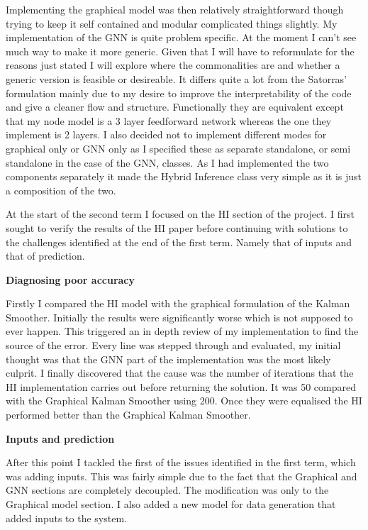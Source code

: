 \documentclass[]{../resources/final_report}
\begin{document}
Implementing the graphical model was then relatively straightforward though trying to keep it self contained and modular complicated things slightly. My implementation of the GNN is quite problem specific. At the moment I can't see much way to make it more generic. Given that I will have to reformulate for the reasons just stated I will explore where the commonalities are and whether a generic version is feasible or desireable. It differs quite a lot from the Satorras' formulation mainly due to my desire to improve the interpretability of the code and give a cleaner flow and structure. Functionally they are equivalent except that my node model is a 3 layer feedforward network whereas the one they implement is 2 layers. I also decided not to implement different modes for graphical only or GNN only as I specified these as separate standalone, or semi standalone in the case of the GNN, classes. As I had implemented the two components separately it made the Hybrid Inference class very simple as it is just a composition of the two.

\pagebreak

At the start of the second term I focused on the HI section of the project. I first sought to verify the results of the HI paper before continuing with solutions to the challenges identified at the end of the first term. Namely that of inputs and that of prediction.

\textbf{Diagnosing poor accuracy}

Firstly I compared the HI model with the graphical formulation of the Kalman Smoother. Initially the results were significantly worse which is not supposed to ever happen. This triggered an in depth review of my implementation to find the source of the error. Every line was stepped through and evaluated, my initial thought was that the GNN part of the implementation was the most likely culprit. I finally discovered that the cause was the number of iterations that the HI implementation carries out before returning the solution. It was 50 compared with the Graphical Kalman Smoother using 200. Once they were equalised the HI performed better than the Graphical Kalman Smoother.

\textbf{Inputs and prediction}

After this point I tackled the first of the issues identified in the first term, which was adding inputs. This was fairly simple due to the fact that the Graphical and GNN sections are completely decoupled. The modification was only to the Graphical model section. I also added a new model for data generation that added inputs to the system.
\end{document}
